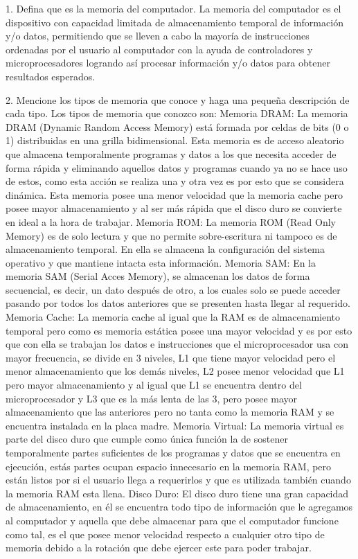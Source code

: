 \documentclass{article}
\begin{document}
1.	Defina que es la memoria del computador.
La memoria del computador es el dispositivo con capacidad limitada de almacenamiento temporal de información y/o datos,  permitiendo que se lleven a cabo la mayoría de instrucciones ordenadas por el usuario al computador con la ayuda de controladores y microprocesadores logrando así procesar información y/o datos  para obtener resultados esperados.

2.	Mencione los tipos de memoria que conoce y haga una pequeña descripción de cada tipo.
Los tipos de memoria que conozco son: 
Memoria DRAM: 
La memoria DRAM (Dynamic Random Access Memory) está formada por celdas de bits (0 o 1) distribuidas en una grilla bidimensional. Esta memoria es de acceso aleatorio que almacena temporalmente programas y datos a los que necesita acceder de forma rápida y eliminando aquellos datos y programas cuando ya no se hace uso de estos, como esta acción se realiza una y otra vez es por esto que se considera dinámica. Esta memoria posee una menor velocidad que la memoria cache pero posee mayor almacenamiento y al ser más rápida que el disco duro se convierte en ideal a la hora de trabajar.
Memoria ROM:
La memoria ROM (Read Only Memory) es de solo lectura y que no permite sobre-escritura ni tampoco es de almacenamiento temporal. En ella se almacena la configuración del sistema operativo y que mantiene intacta esta información.
Memoria SAM:
En la memoria SAM (Serial Acces Memory), se almacenan los datos de forma secuencial, es decir, un dato después de otro, a los cuales solo se puede acceder pasando por todos los datos anteriores que se presenten hasta llegar al requerido.
Memoria Cache:
La memoria cache al igual que la RAM es de almacenamiento temporal pero como es memoria estática posee una mayor velocidad y es por esto que  con ella se trabajan los datos e instrucciones que el microprocesador usa con mayor frecuencia, se divide en 3 niveles, L1 que tiene mayor velocidad pero el menor almacenamiento que los demás niveles, L2 posee menor velocidad que L1 pero mayor almacenamiento y al igual que L1 se encuentra dentro del microprocesador y L3 que es la más lenta de las 3, pero posee mayor almacenamiento que las anteriores pero no tanta como la memoria RAM y se encuentra instalada en la placa madre.
Memoria Virtual: 
La memoria virtual es parte del disco duro que cumple como única función la de sostener temporalmente partes suficientes de los programas y datos que se encuentra en ejecución, estás partes ocupan espacio innecesario en la memoria RAM,  pero están listos por si el usuario llega a requerirlos y que es utilizada también cuando la memoria RAM esta llena.
Disco Duro: 
El disco duro tiene una gran capacidad de almacenamiento, en él se encuentra todo tipo de información que le agregamos al computador y aquella que debe almacenar para que el computador funcione como tal, es el que posee menor velocidad respecto a cualquier otro tipo de memoria debido a la rotación que debe ejercer este para poder trabajar.
\end{document}
